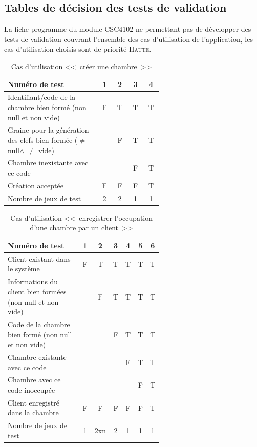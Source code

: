 \documentclass[11pt,article]{article}
\newcommand{\nullvalue}{\textsf{null}\xspace}
\begin{document}
\subsection{Tables de décision des tests de validation}

La fiche programme du module CSC4102 ne permettant pas de développer
des tests de validation couvrant l'ensemble des cas d'utilisation de
l'application, les cas d'utilisation choisis sont de priorité
\textsc{Haute}.

\begin{table}[htbp!]
\begin{tabular}{|p{0.6\linewidth}|c|c|c|c|}
\hline
Numéro de test
&1&2&3&4\\
\hline
\hline
Identifiant/code de la chambre bien formé (non \nullvalue et non vide)
&F&T&T&T\\
\hline
Graine pour la génération des clefs bien formée ($\neq$ \nullvalue $\land$ $\neq$ vide)
& &F&T&T\\
\hline
Chambre inexistante avec ce code
& & &F&T\\
\hline
\hline
Création acceptée
&F&F&F&T\\
\hline
\hline
Nombre de jeux de test
&2&2&1&1\\
\hline
\end{tabular}
\caption{Cas d'utilisation <<~créer une chambre~>>}
\end{table}

\begin{table}[htbp!]
\begin{tabular}{|p{0.6\linewidth}|c|c|c|c|c|c|}
\hline
Numéro de test
&1&2&3&4&5&6\\
\hline
\hline
Client existant dans le système
&F&T&T&T&T&T\\
\hline
Informations du client bien formées (non \nullvalue et non vide)
& &F&T&T&T&T\\
\hline
Code de la chambre bien formé (non \nullvalue et non vide)
& & &F&T&T&T\\
\hline
Chambre existante avec ce code
& & & &F&T&T\\
\hline
Chambre avec ce code inoccupée
& & & & &F&T\\
\hline
\hline
Client enregistré dans la chambre
&F&F&F&F&F&T\\
\hline
\hline
Nombre de jeux de test
&1&2xn&2&1&1&1\\
\hline
\end{tabular}
\caption{Cas d'utilisation <<~enregistrer l'occupation d'une chambre par un client~>>}
\end{table}
\end{document}
